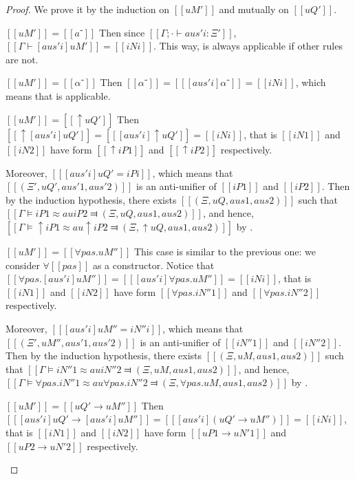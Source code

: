\lemmaAuCompleteness*
\begin{proof}
    We prove it by the induction on $[[uM']]$ and mutually on $[[uQ']]$.
    \begin{caseof}
        \item $[[uM']] = [[â⁻]]$ 
            Then since $[[Γ ; · ⊢ aus'i : Ξ']]$,
            $[[Γ ⊢ [aus'i] uM']] = [[ iNi ]]$. 
            This way,  is always applicable
            if other rules are not.

        \item $[[uM']] = [[α⁻]]$
            Then $[[α⁻]] = [[ [aus'i] α⁻]] = [[ iNi ]]$, which means
            that  is applicable.

        \item $[[uM']] = [[↑uQ']]$
            Then $[[ ↑[aus'i]uQ']] = [[ [aus'i]↑uQ']] = [[ iNi ]]$, that is
            $[[iN1]]$ and $[[iN2]]$ have form $[[↑iP1]]$ and $[[↑iP2]]$ respectively.

            Moreover, $[[ [aus'i]uQ' = iPi ]]$, which means that 
            $[[(Ξ', uQ', aus'1, aus'2)]]$ is an anti-unifier of $[[iP1]]$ and $[[iP2]]$.
            Then by the induction hypothesis, there exists $[[(Ξ, uQ, aus1, aus2)]]$ such that
            $[[Γ ⊨ iP1 ≈au iP2 ⫤ (Ξ, uQ, aus1, aus2)]]$, and hence, 
            $[[Γ ⊨ ↑iP1 ≈au ↑iP2 ⫤ (Ξ, ↑uQ, aus1, aus2)]]$ by .
        \item $[[uM']] = [[∀pas.uM'']]$ This case is similar to the previous one:
            we consider $\forall[[pas]]$ as a constructor. 
            Notice that $[[∀pas.[aus'i]uM'']] = [[ [aus'i]∀pas.uM'']] = [[ iNi ]]$, that is
            $[[iN1]]$ and $[[iN2]]$ have form $[[∀pas.iN''1]]$ and $[[∀pas.iN''2]]$ respectively.

            Moreover, $[[ [aus'i]uM'' = iN''i ]]$, which means that
            $[[(Ξ', uM'', aus'1, aus'2)]]$ is an anti-unifier of $[[iN''1]]$ and $[[iN''2]]$.
            Then by the induction hypothesis, there exists $[[(Ξ, uM, aus1, aus2)]]$ such that
            $[[Γ ⊨ iN''1 ≈au iN''2 ⫤ (Ξ, uM, aus1, aus2)]]$, and hence,
            $[[Γ ⊨ ∀pas.iN''1 ≈au ∀pas.iN''2 ⫤ (Ξ, ∀pas.uM, aus1, aus2)]]$ by 
            .
        \item $[[uM']] = [[uQ' → uM'']]$
            Then $[[ [aus'i]uQ' → [aus'i]uM'']] = [[ [aus'i](uQ' → uM'')]] = [[ iNi ]]$, that is
            $[[iN1]]$ and $[[iN2]]$ have form $[[uP1 → uN'1]]$ and $[[uP2 → uN'2]]$ respectively.


\end{caseof}
\end{proof}
